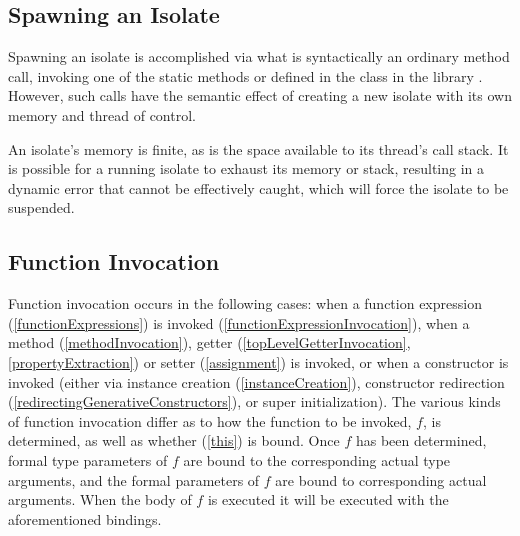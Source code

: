 \documentclass[makeidx]{article}
\begin{document}
{


\subsection{Spawning an Isolate}

\LMHash{}%
Spawning an isolate is accomplished via what is syntactically
an ordinary method call,
invoking one of the static methods  or  defined in
the  class in the library .
However, such calls have the semantic effect of creating
a new isolate with its own memory and thread of control.

\LMHash{}%
An isolate's memory is finite, as is the space available to
its thread's call stack.
It is possible for a running isolate to exhaust its memory or stack,
resulting in a dynamic error that cannot be effectively caught,
which will force the isolate to be suspended.



\subsection{Function Invocation}

\LMHash{}%
Function invocation occurs in the following cases:
when a function expression (\ref{functionExpressions})
is invoked (\ref{functionExpressionInvocation}),
when a method (\ref{methodInvocation}),
getter (\ref{topLevelGetterInvocation}, \ref{propertyExtraction})
or setter (\ref{assignment})
is invoked,
or when a constructor is invoked
(either via instance creation (\ref{instanceCreation}),
constructor redirection (\ref{redirectingGenerativeConstructors}),
or super initialization).
The various kinds of function invocation differ as to
how the function to be invoked, $f$, is determined,
as well as whether \THIS{} (\ref{this}) is bound.
Once $f$ has been determined,
formal type parameters of $f$ are bound to
the corresponding actual type arguments,
and the formal parameters of $f$ are bound to corresponding actual arguments.
When the body of $f$ is executed it will be executed
with the aforementioned bindings.

}
\end{document}
